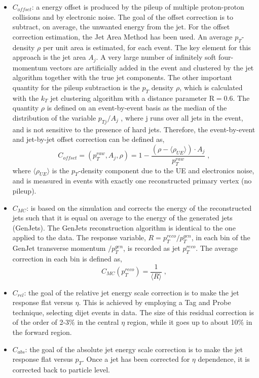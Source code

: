 \begin{itemize}
\item $C_{offset}$: a energy offset is produced by the pileup of multiple proton-proton collisions and by electronic noise.
The goal of the offset correction is to subtract, on average, the unwanted
energy from the jet. For the offset correction estimation, the Jet Area Method has been used. 
An average $p_T$-density $\rho$ per unit area is estimated, for each event. 
The key element for this approach is the jet area $A_j$.
A very large number of infinitely soft four-momentum vectors are artificially added in the event and clustered
by the jet algorithm together with the true jet components. The other important quantity for the pileup subtraction is the $p_T$ density $\rho$, which
is calculated with the $k_T$ jet clustering algorithm with a distance parameter R$=$0.6.
The quantity $\rho$ is defined on an event-by-event basis as the median of the distribution of
the variable $p_{Tj}  /A_j$ , where j runs over all jets in the event, and is not sensitive to the
presence of hard jets. Therefore, the event-by-event and jet-by-jet offset correction can be defined as,
\begin{equation}
  C_{offset}= (p_T^{raw}, A_j ,\rho )=1- \frac{(\rho -\langle \rho_{UE}  \rangle )\cdot A_j }{p_T^{raw}} \; ,
\end{equation}
where $\langle \rho_{UE}  \rangle$ is the $p_T$-density component due to the UE and electronics
noise, and is measured in events with exactly one reconstructed primary vertex (no pileup).
\item $C_{MC}$: is based on the simulation and corrects the energy of the reconstructed
jets such that it is equal on average to the energy of the generated jets (GenJets). The
GenJets reconstruction algorithm is identical to the one applied to the data.
The response variable, $R=p_T^{reco}/p_T^{gen}$, in each bin of the GenJet transverse momentum $/p_T^{gen}$, is recorded as jet $p_T^{reco}$.
The average correction in each bin is defined as,
\begin{equation}
  C_{MC}(p_T^{reco})= \frac{1}{\langle R \rangle } \; ,
\end{equation}
\item $C_{rel}$: the goal of the relative jet energy scale correction is to make the jet response flat versus $\eta$. 
This is achieved by employing a Tag and Probe technique, selecting dijet
events in data. The size of this residual correction is of the order of 2-3\% in the
central $\eta$ region, while it goes up to about 10\% in the forward region.
\item $C_{abs}$: the goal of the absolute jet energy scale correction is to make the jet response flat versus $p_T$.
Once a jet has been corrected for $\eta$ dependence, it is corrected back to particle
level.
\end{itemize}
